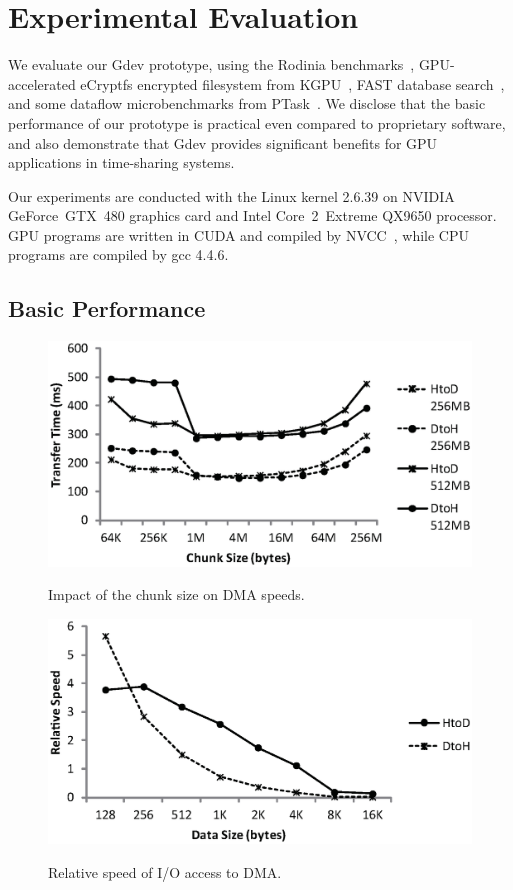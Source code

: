 \section{Experimental Evaluation}
\label{sec:evaluation}

We evaluate our Gdev prototype, using the Rodinia
benchmarks~\cite{Che_IISWC09}, GPU-accelerated eCryptfs encrypted
filesystem from KGPU~\cite{Sun_SECURITY11_Poster}, FAST database
search~\cite{Kim_SIGMOD10}, and some dataflow
microbenchmarks from PTask~\cite{Rossbach_SOSP11}.
We disclose that the basic performance of our prototype is practical
even compared to proprietary software, and also demonstrate that Gdev
provides significant benefits for GPU applications in time-sharing
systems.

Our experiments are conducted with the Linux kernel 2.6.39 on NVIDIA
GeForce~GTX~480 graphics card and Intel Core~2~Extreme QX9650 processor.
GPU programs are written in CUDA and compiled by NVCC~\cite{CUDA40},
while CPU programs are compiled by gcc 4.4.6.

\subsection{Basic Performance}

\begin{figure}[t]
 \begin{center}
  \includegraphics[width=0.8\hsize]{eps/chunk.eps}\\
  \vspace{-1.5em}
  \caption{Impact of the chunk size on DMA speeds.}
  \label{fig:chunk}
 \end{center}
 \begin{center}
  \includegraphics[width=0.8\hsize]{eps/dma.eps}\\
  \vspace{-1.5em}
  \caption{Relative speed of I/O access to DMA.}
  \label{fig:io_access}
 \end{center}
 \vspace{-1.5em}
\end{figure}

